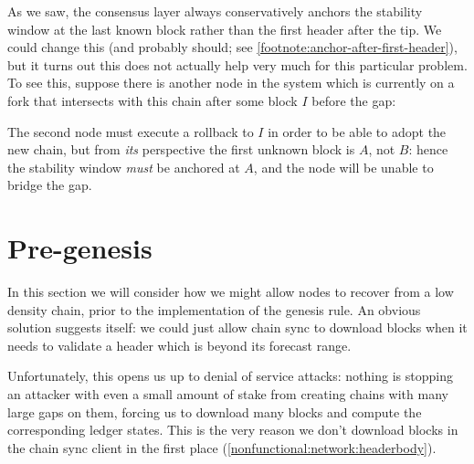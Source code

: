 As we saw, the consensus layer always conservatively anchors the stability
window at the last known block rather than the first header after the tip. We
could change this (and probably should; see
\cref{footnote:anchor-after-first-header}), but it turns out this does not
actually help very much for this particular problem. To see this, suppose there
is another node in the system which is currently on a fork that intersects with
this chain after some block $I$ before the gap:
%
\begin{center}
\end{center}
%
The second node must execute a rollback to $I$ in order to be able to adopt
the new chain, but from \emph{its} perspective the first unknown block is $A$,
not $B$: hence the stability window \emph{must} be anchored at $A$, and the
node will be unable to bridge the gap.

\section{Pre-genesis}
\label{low-density:pre-genesis}

In this section we will consider how we might allow nodes to recover from a low
density chain, prior to the implementation of the genesis rule. An obvious
solution suggests itself: we could just  allow chain sync to download blocks
when it needs to validate a header which is beyond its forecast range.

Unfortunately, this opens us up to denial of service attacks: nothing is
stopping an attacker with even a small amount of stake from creating chains
with many large gaps on them, forcing us to download many blocks and compute
the corresponding ledger states. This is the very reason we don't download
blocks in the chain sync client in the first place
(\cref{nonfunctional:network:headerbody}).

